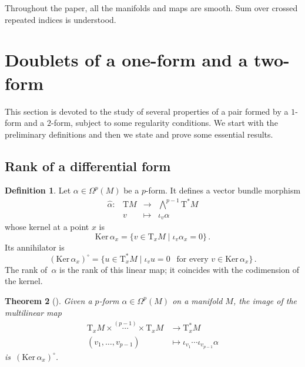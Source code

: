 \documentclass[11pt,twoside]{article}
\theoremstyle{plain}
\newtheorem{theorem}{Theorem}[section]
\theoremstyle{definition}
\newtheorem{definition}[theorem]{Definition}
\newcommand{\T}{{\mathrm T}}
\let\Tan\T
\newcommand{\cT}{\T^{\ast}}
\newcommand*{\inn}[1]{\iota_{#1}}
\def\Ker{\mathrm{Ker \,}}
\def\Tan{\mathrm{T}}
\def\longto{\longrightarrow}
\begin{document}
Throughout the paper, all the manifolds and maps are smooth.
Sum over crossed repeated indices is understood.



\section{Doublets of a one-form and a two-form} 
\label{ch_2}

This section is devoted to the study of several properties 
of a pair formed by a $1$-form and a $2$-form,
subject to some regularity conditions.
We start with the preliminary definitions and then we state and prove some essential results.


\subsection{Rank of a differential form}
\label{sec_2.1}

\begin{definition}
Let $\alpha \in \Omega^p (M)$ be a $p$-form. 
It defines a vector bundle morphism
$$
\begin{array}{rccc}
     \widehat\alpha\colon & \Tan M & \longto & \bigwedge\nolimits^{p-1}\cT M \\
     & v & \longmapsto & \inn{v}\alpha
\end{array}
$$
whose kernel at a point $x$ is 
$$
\Ker \alpha_x = \{ v\in \Tan_x M \mid \inn{v} \alpha_x =0  \}\,.
$$
Its annihilator is 
$$
(\Ker \alpha_x) ^{\circ} = 
\{  u\in \Tan^*_x M\mid \inn{v}u=0\ \ \text{ for every }v\in \Ker \alpha_x\} \,.
$$
The rank of~$\alpha$ is the rank of this linear map;
it coincides with the codimension of the kernel.
\end{definition}



\begin{theorem}[\cite{god_1969}]
\label{theorem_annihilator}
Given a $p$-form $\alpha \in \Omega^{p} (M)$ on a manifold $M$, the image of the multilinear map
\vadjust{\kern -1em}
\begin{align}
\Tan_xM \times \overset{(p-1)}{\dotsb} \times \Tan_xM &\longrightarrow 
\Tan_x^*M 
\\
(v_1,\dotsc,v_{p-1}) &\longmapsto 
\inn{v_1} \dotsb \inn{v_{p-1}} \alpha
\end{align}
is~$(\Ker \alpha_x)^{\circ}$.
\end{theorem}
\end{document}
